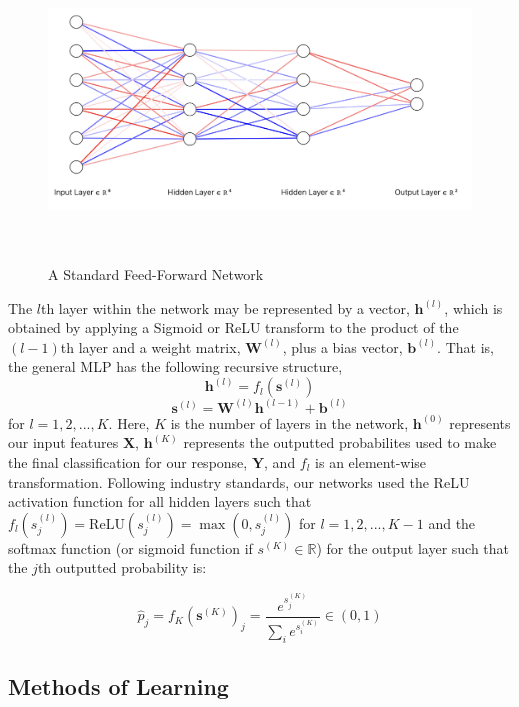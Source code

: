 \documentclass [MAS] {uclathes}
\begin{document}
\begin{figure}[h]
\centering
\includegraphics[height = 80mm, width=130mm]{imgs/ffn.png}
\caption{A Standard Feed-Forward Network}
\label{fig:ffn}
\end{figure}

The $l$th layer within the network may be represented by a vector, $\mathbf{h}^{(l)}$, which is obtained by applying a Sigmoid or ReLU transform to the product of the $(l-1)$th layer and a weight matrix, $\mathbf{W}^{(l)}$, plus a bias vector, $\mathbf{b}^{(l)}$. That is, the general MLP has the following recursive structure, $$\mathbf{h}^{(l)} = f_l(\mathbf{s}^{(l)})$$
$$\mathbf{s}^{(l)} = \mathbf{W}^{(l)}\mathbf{h}^{(l-1)} + \mathbf{b}^{(l)}$$ for $l=1, 2, ..., K$. Here, $K$ is the number of layers in the network, $\mathbf{h}^{(0)}$ represents our input features $\mathbf{X}$, $\mathbf{h}^{(K)}$ represents the outputted probabilites used to make the final classification for our response, $\mathbf{Y}$, and $f_l$ is an element-wise transformation. Following industry standards, our networks used the ReLU activation function for all hidden layers such that $f_l(s^{(l)}_j) = \text{ReLU}(s^{(l)}_j) = \max(0, s^{(l)}_j)$ for $l=1, 2, ..., K-1$ and the softmax function (or sigmoid function if $s^{(K)} \in \mathbb{R}$) for the output layer such that the $j$th outputted probability is:

$$\hat{p}_j = f_K(\mathbf{s}^{(K)})_j = \frac{e^{s^{(K)}_j}}{\sum_i e^{s^{(K)}_i}} \in (0, 1)$$

\subsection{Methods of Learning}
\end{document}
